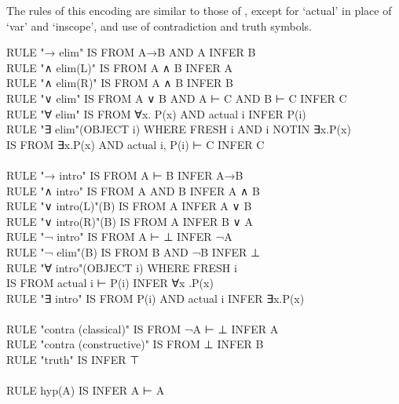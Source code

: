 The rules of this encoding are similar to those of , except for `actual' in place of `var' and `inscope', and use of contradiction and truth symbols.
\begin{japeish}
RULE "→ elim"       IS FROM A→B AND A INFER B \\
RULE "∧ elim(L)"    IS FROM A ∧ B INFER A \\
RULE "∧ elim(R)"    IS FROM A ∧ B INFER B \\
RULE "∨ elim"       IS FROM A ∨ B AND A ⊢ C AND B ⊢ C INFER C \\
RULE "∀ elim"       IS FROM ∀x. P(x) AND actual i INFER P(i) \\
RULE "∃ elim"(OBJECT i) WHERE FRESH i AND i NOTIN ∃x.P(x) \\
                    IS FROM ∃x.P(x) AND actual i, P(i) ⊢ C INFER C \\
 \\
RULE "→ intro"          IS FROM A ⊢ B INFER A→B \\
RULE "∧ intro"          IS FROM A AND B INFER A ∧ B \\
RULE "∨ intro(L)"(B)    IS FROM A INFER A ∨ B \\
RULE "∨ intro(R)"(B)    IS FROM A INFER B ∨ A \\
RULE "¬ intro"          IS FROM A ⊢ ⊥ INFER ¬A \\
RULE "¬ elim"(B)        IS FROM B AND ¬B INFER ⊥ \\
RULE "∀ intro"(OBJECT i) WHERE FRESH i \\
                        IS FROM actual i ⊢ P(i) INFER ∀x .P(x) \\
RULE "∃ intro"          IS FROM P(i) AND actual i INFER ∃x.P(x) \\
 \\
RULE "contra (classical)"    IS FROM ¬A ⊢ ⊥ INFER A \\
RULE "contra (constructive)" IS FROM ⊥ INFER B \\
RULE "truth"                 IS INFER  ⊤ \\
 \\
RULE hyp(A) IS INFER A ⊢ A
\end{japeish}

